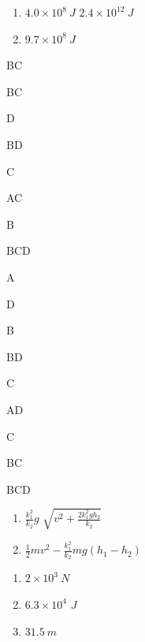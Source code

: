 \item \begin {enumerate} \renewcommand {\labelenumi }{\arabic {enumi}.} \item $ 4.0 \times 10^8 \ J $ \qquad $ 2.4 \times 10^{12} \ J $ \item $ 9.7 \times 10^{8} \ J $ \par \par \end {enumerate} \par \par 
\item BC
\item BC
\item D
\item BD
\item C
\item AC
\item B
\item BCD
\item A
\item D
\item B
\item BD
\item C
\item AD
\item C
\item BC
\item BCD
\item \begin {enumerate} \renewcommand {\labelenumi }{\arabic {enumi}.} \item $\frac { k _ { 1 } ^ { 2 } } { k _ { 2 } } g$ \qquad $\sqrt { v ^ { 2 } + \frac { 2 k _ { 1 } ^ { 2 } g h _ { 2 } } { k _ { 2 } } }$ \item $\frac { 1 } { 2 } m v ^ { 2 } - \frac { k _ { 1 } ^ { 2 } } { k _ { 2 } } m g \left ( h _ { 1 } - h _ { 2 } \right )$ \par \par \end {enumerate} \par \par 
\item \begin {enumerate} \renewcommand {\labelenumi }{\arabic {enumi}.} \item $ 2 \times 10^3 \ N $ \item $ 6.3 \times 10^4 $ $ J $ \item $ 31.5 \ m $ \end {enumerate} \par \par 
